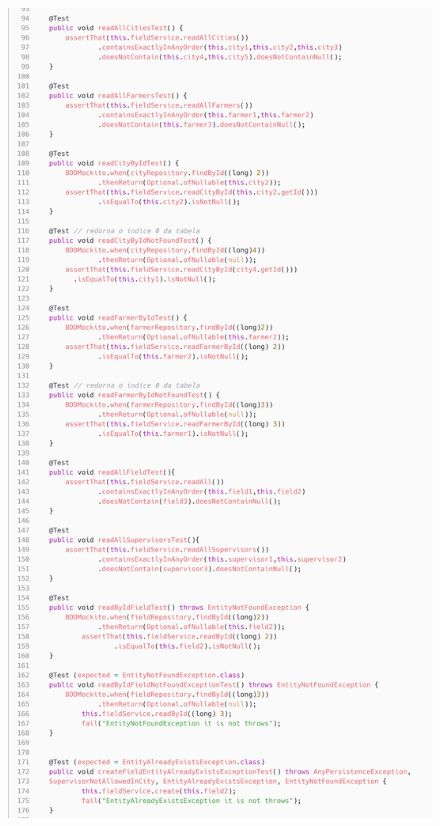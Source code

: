 \begin{itemize}
\begin{figure}[H]
	\centering
	\includegraphics[scale=0.14]{dados/figuras/carbonFieldService1.png}
\end{figure}


\end{itemize}
